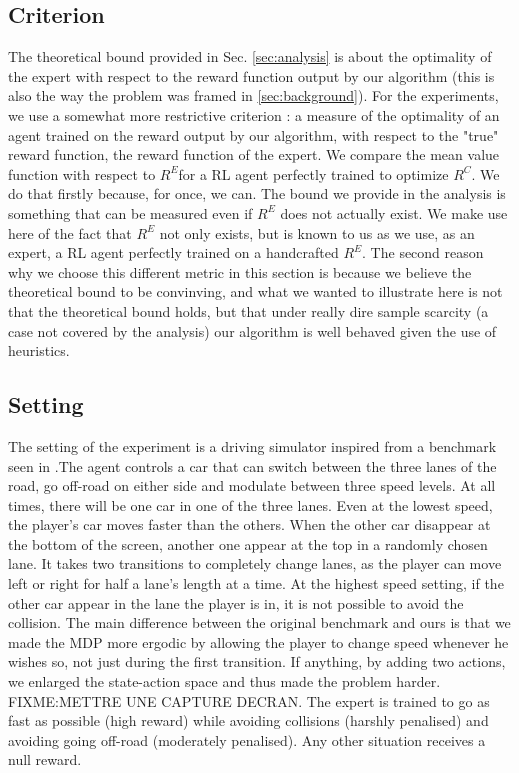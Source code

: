 \documentclass[smallextended]{svjour3}
\begin{document}
\subsection{Criterion}
The theoretical bound provided in Sec. \ref{sec:analysis} is about the optimality of the expert with respect to the reward function output by our algorithm (this is also the way the problem was framed in \ref{sec:background}). For the experiments, we use a somewhat more restrictive criterion : a measure of the optimality of an agent trained on the reward output by our algorithm, with respect to the "true" reward function, the reward function of the expert. We compare the mean value function with respect to $R^E$for a RL agent perfectly trained to optimize $R^C$. We do that firstly because, for once, we can. The bound we provide in the analysis is something that can be measured even if $R^E$ does not actually exist. We make use here of the fact that $R^E$ not only exists, but is known to us as we use, as an expert, a RL agent perfectly trained on a handcrafted $R^E$. The second reason why we choose this different metric in this section is because we believe the theoretical bound to be convinving, and what we wanted to illustrate here is not that the theoretical bound holds, but that under really dire sample scarcity (a case not covered by the analysis) our algorithm is well behaved given the use of heuristics.
\subsection{Setting}
The setting of the experiment is a driving simulator inspired from a benchmark seen in \cite{syed2008apprenticeship,syed2008game}.The agent controls a car that can switch between the three lanes of the road, go off-road on either side and modulate between three speed levels. At all times, there will be one car in one of the three lanes. Even at the lowest speed, the player's car moves faster than the others. When the other car disappear at the bottom of the screen, another one appear at the top in a randomly chosen lane. It takes two transitions to completely change lanes, as the player can move left or right for half a lane's length at a time. At the highest speed setting, if the other car appear in the lane the player is in, it is not possible to avoid the collision. The main difference between the original benchmark and ours is that we made the MDP more ergodic by allowing the player to change speed whenever he wishes so, not just during the first transition. If anything, by adding two actions, we enlarged the state-action space and thus made the problem harder. FIXME:METTRE UNE CAPTURE DECRAN. The expert is trained to go as fast as possible (high reward) while avoiding collisions (harshly penalised) and avoiding going off-road (moderately penalised). Any other situation receives a null reward.
\end{document}

